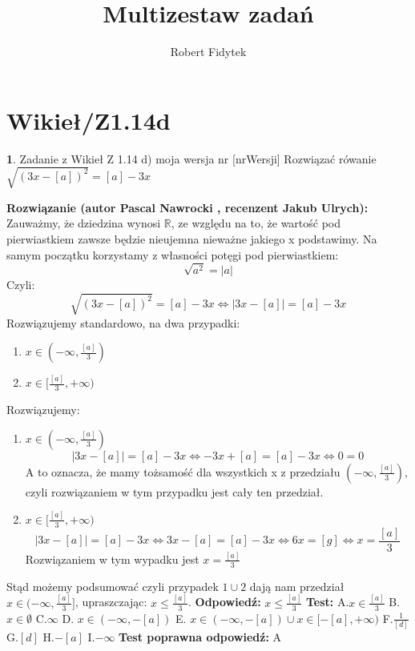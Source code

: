 \documentclass[12pt, a4paper]{article}
\title{Multizestaw zadań}
\author{Robert Fidytek}
\date{}
\theoremstyle{definition} %
\newtheorem{zad}{}
\newcommand{\kategoria}[1]{\section{#1}} %
\newcommand{\zadStart}[1]{\begin{zad}#1\newline} %
\newcommand{\zadStop}{\end{zad}}   %
\newcommand{\rozwStart}[2]{\noindent \textbf{Rozwiązanie (autor #1 , recenzent #2): }\newline} %
\newcommand{\odpStart}{\noindent \textbf{Odpowiedź:}\newline}    %
\newcommand{\odpStop}{\newline}                                             %
\newcommand{\testStart}{\noindent \textbf{Test:}\newline} %
\newcommand{\testStop}{\newline} %
\newcommand{\kluczStart}{\noindent \textbf{Test poprawna odpowiedź:}\newline} %
\newcommand{\kluczStop}{\newline} %
\begin{document}
\maketitle



\kategoria{Wikieł/Z1.14d}
\zadStart{Zadanie z Wikieł Z 1.14 d) moja wersja nr [nrWersji]}
Rozwiązać rówanie $\sqrt{{(3x-[a])}^2}=[a]-3x$
\zadStop
\rozwStart{Pascal Nawrocki}{Jakub Ulrych}
Zauważmy, że dziedzina wynosi $\mathbb{R}$, ze względu na to, że wartość pod pierwiastkiem zawsze będzie nieujemna nieważne jakiego x podstawimy.
Na samym początku korzystamy z własności potęgi pod pierwiastkiem: $$\sqrt{a^2}=|a|$$
Czyli:
$$\sqrt{{(3x-[a])}^2}=[a]-3x \Leftrightarrow |3x-[a]|=[a]-3x $$
Rozwiązujemy standardowo, na dwa przypadki:
\begin{enumerate}
\item$x\in(-\infty,\frac{[a]}{3})$
\item$x\in[\frac{[a]}{3},+\infty)$
\end{enumerate}
Rozwiązujemy:
\begin{enumerate}
\item$x\in(-\infty,\frac{[a]}{3})$
$$|3x-[a]|=[a]-3x\Leftrightarrow-3x+[a]=[a]-3x\Leftrightarrow 0=0$$
A to oznacza, że mamy tożsamość dla wszystkich x z przedziału $(-\infty,\frac{[a]}{3})$, czyli rozwiązaniem w tym przypadku jest cały ten przedział.
\item$x\in[\frac{[a]}{3},+\infty)$
$$|3x-[a]|=[a]-3x\Leftrightarrow3x-[a]=[a]-3x\Leftrightarrow6x=[g]\Leftrightarrow x=\frac{[a]}{3}$$
Rozwiązaniem w tym wypadku jest $x=\frac{[a]}{3}$
\end{enumerate}
Stąd możemy podsumować czyli przypadek $1\cup2$ dają nam przedział $x\in(-\infty,\frac{[a]}{3}]$, upraszczając: $x\leq\frac{[a]}{3}$.
\odpStart
$x\leq\frac{[a]}{3}$
\odpStop
\testStart
A.$x\in\frac{[a]}{3}$
B.$x\in \emptyset$
C.$\infty$
D. $x\in (-\infty,-[a])$
E. $x\in (-\infty,-[a])\cup x\in[-[a],+\infty)$
F.$\frac{1}{[d]}$
G.$[d]$
H.$-[a]$
I.$-\infty$
\testStop
\kluczStart
A
\kluczStop
\end{document}
